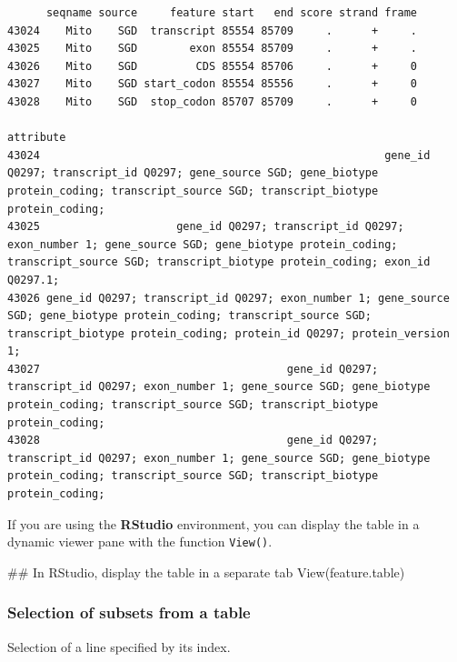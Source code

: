 \documentclass[]{article}
\newenvironment{Shaded}{\begin{snugshade}}{\end{snugshade}}
\newcommand{\KeywordTok}[1]{\textcolor[rgb]{0.94,0.87,0.69}{#1}}
\newcommand{\NormalTok}[1]{\textcolor[rgb]{0.80,0.80,0.80}{#1}}
\begin{document}
\begin{verbatim}
      seqname source     feature start   end score strand frame
43024    Mito    SGD  transcript 85554 85709     .      +     .
43025    Mito    SGD        exon 85554 85709     .      +     .
43026    Mito    SGD         CDS 85554 85706     .      +     0
43027    Mito    SGD start_codon 85554 85556     .      +     0
43028    Mito    SGD  stop_codon 85707 85709     .      +     0
                                                                                                                                                                                            attribute
43024                                                     gene_id Q0297; transcript_id Q0297; gene_source SGD; gene_biotype protein_coding; transcript_source SGD; transcript_biotype protein_coding;
43025                     gene_id Q0297; transcript_id Q0297; exon_number 1; gene_source SGD; gene_biotype protein_coding; transcript_source SGD; transcript_biotype protein_coding; exon_id Q0297.1;
43026 gene_id Q0297; transcript_id Q0297; exon_number 1; gene_source SGD; gene_biotype protein_coding; transcript_source SGD; transcript_biotype protein_coding; protein_id Q0297; protein_version 1;
43027                                      gene_id Q0297; transcript_id Q0297; exon_number 1; gene_source SGD; gene_biotype protein_coding; transcript_source SGD; transcript_biotype protein_coding;
43028                                      gene_id Q0297; transcript_id Q0297; exon_number 1; gene_source SGD; gene_biotype protein_coding; transcript_source SGD; transcript_biotype protein_coding;
\end{verbatim}

If you are using the \textbf{RStudio} environment, you can display the
table in a dynamic viewer pane with the function \texttt{View()}.

\begin{Shaded}
\begin{Highlighting}[]
\NormalTok{## In RStudio, display the table in a separate tab}
\KeywordTok{View}\NormalTok{(feature.table) }
\end{Highlighting}
\end{Shaded}

\subsubsection{Selection of subsets from a
table}\label{selection-of-subsets-from-a-table}

Selection of a line specified by its index.
\end{document}
